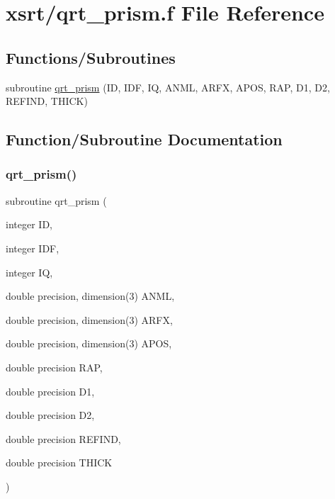 \hypertarget{qrt__prism_8f}{}\section{xsrt/qrt\+\_\+prism.f File Reference}
\label{qrt__prism_8f}
\subsection*{Functions/\+Subroutines}
\begin{DoxyCompactItemize}
\item 
subroutine \hyperlink{qrt__prism_8f_a60421bc92132331bbda751634c9ecf75}{qrt\+\_\+prism} (ID, I\+DF, IQ, A\+N\+ML, A\+R\+FX, A\+P\+OS, R\+AP, D1, D2, R\+E\+F\+I\+ND, T\+H\+I\+CK)
\end{DoxyCompactItemize}


\subsection{Function/\+Subroutine Documentation}
\mbox{\label{qrt__prism_8f_a60421bc92132331bbda751634c9ecf75}} 
\subsubsection{\texorpdfstring{qrt\+\_\+prism()}{qrt\_prism()}}
{\footnotesize\ttfamily subroutine qrt\+\_\+prism (\begin{DoxyParamCaption}\item[{integer}]{ID,  }\item[{integer}]{I\+DF,  }\item[{integer}]{IQ,  }\item[{double precision, dimension(3)}]{A\+N\+ML,  }\item[{double precision, dimension(3)}]{A\+R\+FX,  }\item[{double precision, dimension(3)}]{A\+P\+OS,  }\item[{double precision}]{R\+AP,  }\item[{double precision}]{D1,  }\item[{double precision}]{D2,  }\item[{double precision}]{R\+E\+F\+I\+ND,  }\item[{double precision}]{T\+H\+I\+CK }\end{DoxyParamCaption})}

